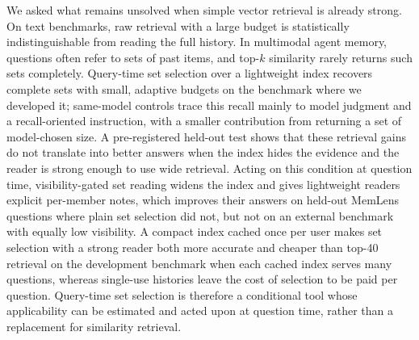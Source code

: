 We asked what remains unsolved when simple vector retrieval is already strong. On text benchmarks, raw retrieval with a large budget is statistically indistinguishable from reading the full history. In multimodal agent memory, questions often refer to sets of past items, and top-$k$ similarity rarely returns such sets completely. Query-time set selection over a lightweight index recovers complete sets with small, adaptive budgets on the benchmark where we developed it; same-model controls trace this recall mainly to model judgment and a recall-oriented instruction, with a smaller contribution from returning a set of model-chosen size. A pre-registered held-out test shows that these retrieval gains do not translate into better answers when the index hides the evidence and the reader is strong enough to use wide retrieval. Acting on this condition at question time, visibility-gated set reading widens the index and gives lightweight readers explicit per-member notes, which improves their answers on held-out MemLens questions where plain set selection did not, but not on an external benchmark with equally low visibility. A compact index cached once per user makes set selection with a strong reader both more accurate and cheaper than top-40 retrieval on the development benchmark when each cached index serves many questions, whereas single-use histories leave the cost of selection to be paid per question. Query-time set selection is therefore a conditional tool whose applicability can be estimated and acted upon at question time, rather than a replacement for similarity retrieval.
